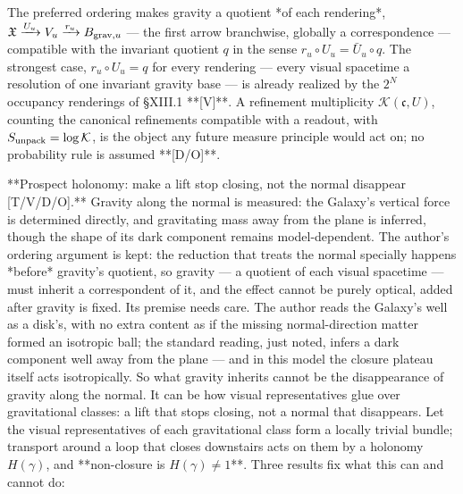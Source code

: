 The preferred ordering makes gravity a quotient *of each rendering*, $\mathfrak X\xrightarrow{U_u}V_u\xrightarrow{r_u}B_{ {\rm grav},u}$ — the first arrow branchwise, globally a correspondence — compatible with the invariant quotient $q$ in the sense $r_u\circ U_u = \bar U_u\circ q$. The strongest case, $r_u\circ U_u = q$ for every rendering — every visual spacetime a resolution of one invariant gravity base — is already realized by the $2^N$ occupancy renderings of §XIII.1 **[V]**. A refinement multiplicity $\mathcal K(\mathfrak c,U)$, counting the canonical refinements compatible with a readout, with $S_{\rm unpack} = \log\mathcal K$, is the object any future measure principle would act on; no probability rule is assumed **[D/O]**.

**Prospect holonomy: make a lift stop closing, not the normal disappear [T/V/D/O].** Gravity along the normal is measured: the Galaxy's vertical force is determined directly, and gravitating mass away from the plane is inferred, though the shape of its dark component remains model-dependent. The author's ordering argument is kept: the reduction that treats the normal specially happens *before* gravity's quotient, so gravity — a quotient of each visual spacetime — must inherit a correspondent of it, and the effect cannot be purely optical, added after gravity is fixed. Its premise needs care. The author reads the Galaxy's well as a disk's, with no extra content as if the missing normal-direction matter formed an isotropic ball; the standard reading, just noted, infers a dark component well away from the plane — and in this model the closure plateau itself acts isotropically. So what gravity inherits cannot be the disappearance of gravity along the normal. It can be how visual representatives glue over gravitational classes: a lift that stops closing, not a normal that disappears. Let the visual representatives of each gravitational class form a locally trivial bundle; transport around a loop that closes downstairs acts on them by a holonomy $H(\gamma)$, and **non-closure is $H(\gamma)\neq1$**. Three results fix what this can and cannot do:

